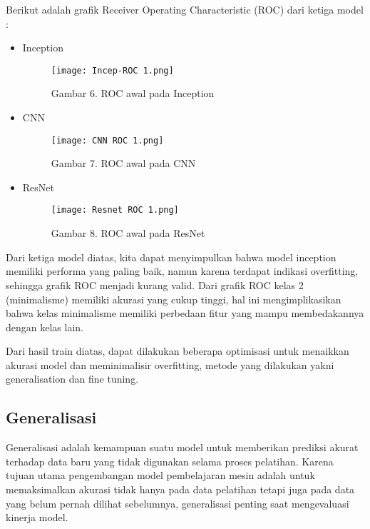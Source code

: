 \documentclass[12pt,a4paper]{article}
\begin{document}
Berikut adalah grafik  Receiver Operating Characteristic (ROC) dari ketiga model :
\begin{itemize}
    \item Inception
    \begin{figure}[H]
        \centering
       \texttt{[image: Incep-ROC 1.png]}
        \caption*{Gambar 6. ROC awal pada Inception}
        \label{fig:enter-label}
    \end{figure}
\end{itemize}
\begin{itemize}
    \item CNN
    \begin{figure}[H]
        \centering
       \texttt{[image: CNN ROC 1.png]}
        \caption*{Gambar 7. ROC awal pada CNN}
        \label{fig:enter-label}
    \end{figure}
\end{itemize}
\begin{itemize}
    \item ResNet
    \begin{figure}[H]
        \centering
       \texttt{[image: Resnet ROC 1.png]}
        \caption*{Gambar 8. ROC awal pada ResNet}
        \label{fig:enter-label}
    \end{figure}
\end{itemize}
Dari ketiga model diatas, kita dapat menyimpulkan bahwa model inception memiliki performa yang paling baik, namun karena terdapat indikasi overfitting, sehingga grafik ROC menjadi kurang valid. Dari grafik ROC kelas 2 (minimalisme) memiliki akurasi yang cukup tinggi, hal ini mengimplikasikan bahwa kelas minimalisme memiliki perbedaan fitur yang mampu membedakannya dengan kelas lain.



\noindent Dari hasil train diatas, dapat dilakukan beberapa optimisasi untuk menaikkan akurasi model dan meminimalisir overfitting, metode yang dilakukan yakni generalisation dan fine tuning.

\subsection{Generalisasi}
Generalisasi adalah kemampuan suatu model untuk memberikan prediksi akurat terhadap data baru yang tidak digunakan selama proses pelatihan. Karena tujuan utama pengembangan model pembelajaran mesin adalah untuk memaksimalkan akurasi tidak hanya pada data pelatihan tetapi juga pada data yang belum pernah dilihat sebelumnya, generalisasi penting saat mengevaluasi kinerja model. 
\end{document}
